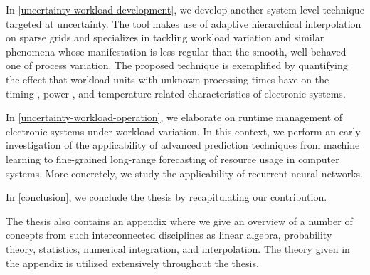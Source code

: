 In \cref{uncertainty-workload-development}, we develop another system-level
technique targeted at uncertainty. The tool makes use of adaptive hierarchical
interpolation on sparse grids and specializes in tackling workload variation and
similar phenomena whose manifestation is less regular than the smooth,
well-behaved one of process variation. The proposed technique is exemplified by
quantifying the effect that workload units with unknown processing times have on
the timing-, power-, and temperature-related characteristics of electronic
systems.

In \cref{uncertainty-workload-operation}, we elaborate on runtime management of
electronic systems under workload variation. In this context, we perform an
early investigation of the applicability of advanced prediction techniques from
machine learning to fine-grained long-range forecasting of resource usage in
computer systems. More concretely, we study the applicability of recurrent
neural networks.

In \cref{conclusion}, we conclude the thesis by recapitulating our contribution.

The thesis also contains an appendix where we give an overview of a number of
concepts from such interconnected disciplines as linear algebra, probability
theory, statistics, numerical integration, and interpolation. The theory given
in the appendix is utilized extensively throughout the thesis.
